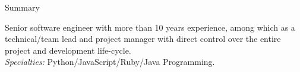 \documentclass[]{mcdowellcv}
\begin{document}
    \makeheader
    \label{Contact}

    \begin{cvsection}{Summary}
        \label{Summary}
        \begin{cvsubsection}{}{}{}
            Senior software engineer with more than 10 years experience, among which as a technical/team lead and project manager with direct control over the entire project and development life-cycle.\\
            \textit{Specialties:} Python/JavaScript/Ruby/Java Programming.
        \end{cvsubsection}
    \end{cvsection}

\end{document}
